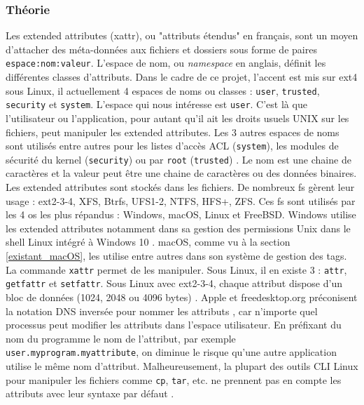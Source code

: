 \documentclass[a4paper, 12pt]{article}
\begin{document}
\subsubsection{Théorie}
Les extended attributes (\acrshort{xattr}), ou "attributs étendus" en français, sont un moyen d'attacher des 
méta-données aux fichiers et dossiers sous forme de paires \texttt{espace:nom:valeur}. 
L'espace de nom, ou \textit{namespace} en anglais, définit les différentes classes d'attributs. 
Dans le cadre de ce projet, l'accent est mis sur ext4 sous Linux, il actuellement 4 espaces de noms 
ou classes : \texttt{user}, \texttt{trusted}, \texttt{security} et 
\texttt{system}. L'espace qui nous intéresse est \texttt{user}. C'est là que 
l'utilisateur ou l'application, pour autant qu'il ait les droits usuels UNIX sur les fichiers, peut 
manipuler les extended attributes. Les 3 autres espaces de noms sont utilisés entre autres pour 
les listes d'accès ACL (\texttt{system}), les modules de sécurité du kernel 
(\texttt{security}) ou par \texttt{root} (\texttt{trusted})
\cite{ref11} \cite{ref12}.
Le nom est une chaine de caractères et la valeur peut être une chaine de caractères ou des données binaires. 
Les extended attributes sont stockés dans les fichiers. De nombreux \acrshort{fs} gèrent leur 
usage : ext2-3-4, XFS, Btrfs, UFS1-2, NTFS, HFS+, ZFS. Ces \acrshort{fs} sont utilisés par 
les 4 \acrshort{os} les plus répandus : Windows, macOS, Linux et FreeBSD. Windows utilise 
les extended attributes notamment dans sa gestion des permissions Unix dans le shell Linux intégré 
à Windows 10 \cite{ref21}. macOS, comme vu à la section \ref{existant_macOS}, les utilise entre 
autres dans son système de gestion des tags. La commande \texttt{xattr} permet de les 
manipuler. Sous Linux, il en existe 3 : \texttt{attr}, \texttt{getfattr} et 
\texttt{setfattr}. Sous Linux avec ext2-3-4, chaque attribut dispose d'un bloc de données 
(1024, 2048 ou 4096 bytes) \cite{ref12}.
Apple et freedesktop.org préconisent la notation DNS inversée pour 
nommer les attributs \cite{ref8}, \cite{ref24} car n'importe quel processus peut modifier les 
attributs dans l'espace utilisateur. En préfixant du nom du programme le nom de l'attribut, par 
exemple \texttt{user.myprogram.myattribute}, on diminue le risque qu'une autre 
application utilise le même nom d'attribut. Malheureusement, la plupart des outils CLI Linux 
pour manipuler les fichiers comme \texttt{cp}, \texttt{tar}, etc. ne prennent 
pas en compte les attributs avec leur syntaxe par défaut \cite{ref4}.
\end{document}
